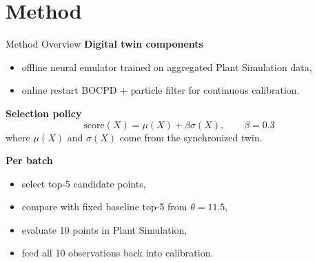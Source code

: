 \documentclass[aspectratio=169,11pt]{beamer}
\begin{document}
\section{Method}

\begin{frame}{Method Overview}
    \textbf{Digital twin components}
    \begin{itemize}
        \item offline neural emulator trained on aggregated Plant Simulation data,
        \item online restart BOCPD + particle filter for continuous calibration.
    \end{itemize}

    \vspace{0.3cm}
    \textbf{Selection policy}
    \[
    \text{score}(X)=\mu(X)+\beta\sigma(X), \qquad \beta=0.3
    \]
    where $\mu(X)$ and $\sigma(X)$ come from the synchronized twin.

    \vspace{0.3cm}
    \textbf{Per batch}
    \begin{itemize}
        \item select top-5 candidate points,
        \item compare with fixed baseline top-5 from $\theta=11.5$,
        \item evaluate 10 points in Plant Simulation,
        \item feed all 10 observations back into calibration.
    \end{itemize}
\end{frame}
\end{document}
